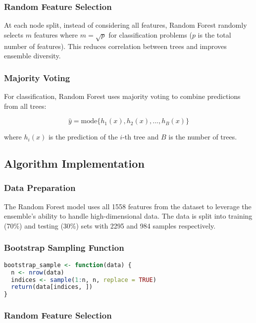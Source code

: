 \subsubsection{Random Feature Selection}

At each node split, instead of considering all features, Random Forest randomly selects $m$ features where $m = \sqrt{p}$ for classification problems ($p$ is the total number of features). This reduces correlation between trees and improves ensemble diversity.

\subsubsection{Majority Voting}

For classification, Random Forest uses majority voting to combine predictions from all trees:

\begin{equation}
\hat{y} = \text{mode}\{h_1(x), h_2(x), ..., h_B(x)\}
\end{equation}

where $h_i(x)$ is the prediction of the $i$-th tree and $B$ is the number of trees.

\subsection{Algorithm Implementation}

\subsubsection{Data Preparation}

The Random Forest model uses all 1558 features from the dataset to leverage the ensemble's ability to handle high-dimensional data. The data is split into training (70\%) and testing (30\%) sets with 2295 and 984 samples respectively.

\subsubsection{Bootstrap Sampling Function}

\begin{lstlisting}[language=R, caption=Bootstrap Sampling Implementation]
bootstrap_sample <- function(data) {
  n <- nrow(data)
  indices <- sample(1:n, n, replace = TRUE)
  return(data[indices, ])
}
\end{lstlisting}

\subsubsection{Random Feature Selection}

